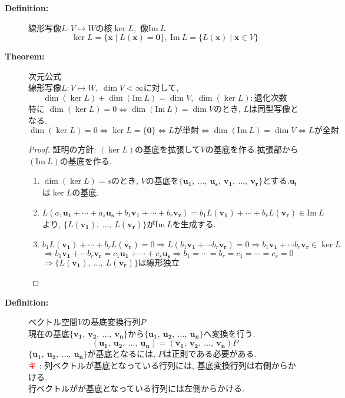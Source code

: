 \documentclass[dvipdfmx]{jsarticle}
\newcommand*{\point}{\textcircled{\textcolor{red}{\scriptsize キ}} }
\begin{document}
\begin{description}
    \item[\bf{Definition:}] 線形写像$L : V \mapsto W$の核$\ker L$,\ 像$\mathrm{Im} \ L$
        $$ \ker L = \{ \bm{x} \mid L(\bm{x}) = \bm{0} \},\ \mathrm{Im} \ L = \{ L(\bm{x}) \mid \bm{x} \in V \}$$
    \item[\bf{Theorem:}] 次元公式 \\
        線形写像$L : V \mapsto W,\ \dim V < \infty$に対して, 
        $$ \dim (\ker L) + \dim (\mathrm{Im} \ L) = \dim V,\ \dim (\ker L) : \text{退化次数} $$
        特に $\dim (\ker L) = 0  \Longleftrightarrow \dim (\mathrm{Im} \ L) = \dim V$のとき, $L$は同型写像となる.
        $$ \dim (\ker L) = 0 \Leftrightarrow \ker L = \{ \bm{0} \} \Leftrightarrow L\text{が単射} \Longleftrightarrow  \dim (\mathrm{Im} \ L) = \dim V \Leftrightarrow L\text{が全射} $$
        \begin{proof} 証明の方針: $(\ker L)$の基底を拡張して$V$の基底を作る.拡張部から$(\mathrm{Im} \ L)$の基底を作る.
            \begin{enumerate}
                \item $\dim (\ker L) = s$のとき, $V$の基底を$\{ \bm{u_1},\ \dots,\ \bm{u_s},\ \bm{v_1},\ \dots,\ \bm{v_r} \}$とする.$\bm{u_i}$は$\ker L$の基底.
                \item $L( a_1\bm{u_1} + \cdots + a_s\bm{u_s} + b_1\bm{v_1} + \cdots + b_r\bm{v_r}) = b_1L(\bm{v_1}) + \cdots + b_rL(\bm{v_r}) \in \mathrm{Im} \ L $ より, $\{ L(\bm{v_1}),\ \dots,\ L(\bm{v_r}) \}$が$\mathrm{Im} \ L$を生成する.
                \item $b_1L(\bm{v_1}) + \cdots + b_rL(\bm{v_r}) = 0 \Rightarrow L(b_1\bm{v_1} + \cdots b_r\bm{v_r}) = 0 \Rightarrow b_1\bm{v_1} + \cdots b_r\bm{v_r} \in \ker L$ \\ 
                $\Rightarrow b_1\bm{v_1} + \cdots b_r\bm{v_r} = c_1\bm{u_1} + \cdots +c_s\bm{u_s} \Rightarrow b_1 = \cdots = b_r = c_1 = \cdots = c_s = 0 $ \\
                $\Rightarrow \{ L(\bm{v_1}),\ \dots,\ L(\bm{v_r}) \} \text{は線形独立}$
            \end{enumerate}
        \end{proof}

    \item[\bf{Definition:}] ベクトル空間$V$の基底変換行列$P$ \\
        現在の基底$\{ \bm{v_1},\ \bm{v_2},\ \dots,\ \bm{v_n} \}$から$\{ \bm{u_1},\ \bm{u_2},\ \dots,\ \bm{u_n} \}$へ変換を行う.
            $$( \bm{u_1},\ \bm{u_2},\ \dots,\ \bm{u_n} ) = ( \bm{v_1},\ \bm{v_2},\ \dots,\ \bm{v_n} ) P$$
        $\{ \bm{u_1},\ \bm{u_2},\ \dots,\ \bm{u_n} \}$が基底となるには, $P$は正則である必要がある. \\
        \point : 列ベクトルが基底となっている行列には, 基底変換行列は右側からかける. \\
        行ベクトルがが基底となっている行列には左側からかける.
        

\end{description}
\end{document}
